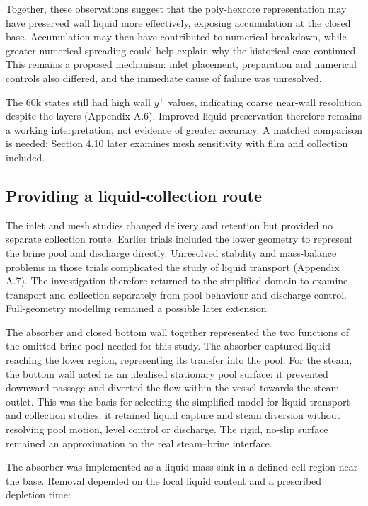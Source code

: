 \documentclass[12pt]{article}
\begin{document}
Together, these observations suggest that the poly-hexcore representation may have preserved wall liquid more effectively, exposing accumulation at the closed base. Accumulation may then have contributed to numerical breakdown, while greater numerical spreading could help explain why the historical case continued. This remains a proposed mechanism: inlet placement, preparation and numerical controls also differed, and the immediate cause of failure was unresolved.

The 60k states still had high wall \(y^+\) values, indicating coarse near-wall resolution despite the layers (Appendix A.6). Improved liquid preservation therefore remains a working interpretation, not evidence of greater accuracy. A matched comparison is needed; Section 4.10 later examines mesh sensitivity with film and collection included.

\subsection{Providing a liquid-collection route}\label{providing-a-liquid-collection-route}

The inlet and mesh studies changed delivery and retention but provided no separate collection route. Earlier trials included the lower geometry to represent the brine pool and discharge directly. Unresolved stability and mass-balance problems in those trials complicated the study of liquid transport (Appendix A.7). The investigation therefore returned to the simplified domain to examine transport and collection separately from pool behaviour and discharge control. Full-geometry modelling remained a possible later extension.

The absorber and closed bottom wall together represented the two functions of the omitted brine pool needed for this study. The absorber captured liquid reaching the lower region, representing its transfer into the pool. For the steam, the bottom wall acted as an idealised stationary pool surface: it prevented downward passage and diverted the flow within the vessel towards the steam outlet. This was the basis for selecting the simplified model for liquid-transport and collection studies: it retained liquid capture and steam diversion without resolving pool motion, level control or discharge. The rigid, no-slip surface remained an approximation to the real steam--brine interface.

The absorber was implemented as a liquid mass sink in a defined cell region near the base. Removal depended on the local liquid content and a prescribed depletion time:
\end{document}
